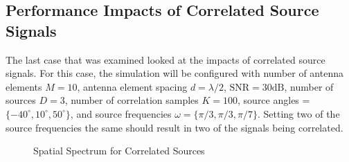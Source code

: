 \documentclass[conference]{IEEEtran}
\begin{document}
		\subsection{Performance Impacts of Correlated Source Signals}
		
		The last case that was examined looked at the impacts of correlated source signals. For this case, the simulation will be configured with number of antenna elements $M=10$, antenna element spacing $d = \lambda/2$, $\text{SNR}=30\text{dB}$, number of sources $D=3$, number of correlation samples $K=100$, source angles = $\{-40^{\circ}, 10^{\circ}, 50^{\circ}\}$, and source frequencies $\omega = \{\pi/3, \pi/3, \pi/7\}$. Setting two of the source frequencies the same should result in two of the signals being correlated. 
		
		\begin{figure}
			\centerline{}
			\caption{Spatial Spectrum for Correlated Sources}
			\label{fig::correlated_signals}
		\end{figure}
		
\end{document}
